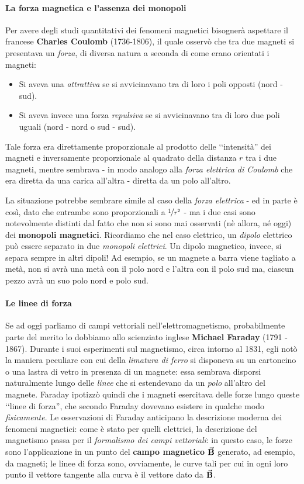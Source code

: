 \paragraph{La forza magnetica e l'assenza dei monopoli}
Per avere degli studi quantitativi dei fenomeni magnetici bisognerà aspettare il francese \textbf{Charles Coulomb} (1736-1806), il quale osservò che tra due magneti si presentava un \textit{forza}, di diversa natura a seconda di come erano orientati i magneti:
\begin{itemize}
	\item Si aveva una \textit{attrattiva} se si avvicinavano tra di loro i poli opposti (nord - sud).
	\item Si aveva invece una forza \textit{repulsiva} se si avvicinavano tra di loro due poli uguali (nord - nord o sud - sud).
\end{itemize}
Tale forza era direttamente proporzionale al prodotto delle ‘‘intensità'' dei magneti e inversamente proporzionale al quadrato della distanza $r$ tra i due magneti, mentre sembrava - in modo analogo alla \textit{forza elettrica di Coulomb} che era diretta da una carica all'altra - diretta da un polo all'altro.

La situazione potrebbe sembrare simile al caso della \textit{forza elettrica} - ed in parte è così, dato che entrambe sono proporzionali a $\nicefrac{1}{r^2}$ - ma i due casi sono notevolmente distinti dal fatto che non si sono mai osservati (nè allora, né oggi) dei \textbf{monopoli magnetici}. Ricordiamo che nel caso elettrico, un \textit{dipolo} elettrico può essere separato in due \textit{monopoli elettrici}.
Un dipolo magnetico, invece, si separa sempre in altri dipoli! Ad esempio, se un magnete a barra viene tagliato a metà, non si avrà una metà con il polo nord e l'altra con il polo sud ma, ciascun pezzo avrà un suo polo nord e polo sud.
\paragraph{Le linee di forza}
Se ad oggi parliamo di campi vettoriali nell'elettromagnetismo, probabilmente parte del merito lo dobbiamo allo scienziato inglese \textbf{Michael Faraday} (1791 - 1867). Durante i suoi esperimenti sul magnetismo, circa intorno al 1831, egli notò la maniera peculiare con cui della \textit{limatura di ferro} si disponeva su un cartoncino o una lastra di vetro in presenza di un magnete: essa sembrava disporsi naturalmente lungo delle \textit{linee} che si estendevano da un \textit{polo} all'altro del magnete. Faraday ipotizzò quindi che i magneti esercitava delle forze lungo queste ‘‘linee di forza'', che secondo Faraday dovevano esistere in qualche modo \textit{fisicamente}.
Le osservazioni di Faraday anticipano la descrizione moderna dei fenomeni magnetici: come è stato per quelli elettrici, la descrizione del magnetismo passa per il \textit{formalismo dei campi vettoriali}: in questo caso, le forze sono l'applicazione in un punto del \textbf{campo magnetico} $\vb*{\va{B}}$ generato, ad esempio, da magneti; le linee di forza sono, ovviamente, le curve tali per cui in ogni loro punto il vettore tangente alla curva è il vettore dato da $\vb*{\va{B}}$.
